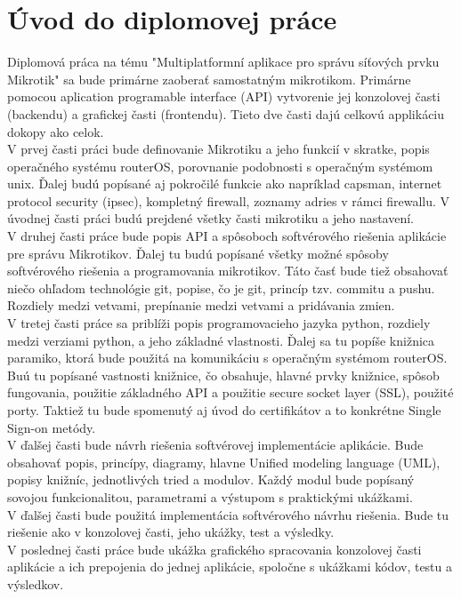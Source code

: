 \chapter{Úvod do diplomovej práce}
Diplomová práca na tému "Multiplatformní aplikace pro správu síťových prvku Mikrotik" sa bude primárne zaoberať samostatným mikrotikom. Primárne pomocou aplication programable interface (API) vytvorenie jej konzolovej časti (backendu) a grafickej časti (frontendu). Tieto dve časti dajú celkovú applikáciu dokopy ako celok.\\
V prvej časti práci bude definovanie Mikrotiku a jeho funkcií v skratke, popis operačného systému routerOS, porovnanie podobnosti s operačným systémom unix. Ďalej budú popísané aj pokročilé funkcie ako napríklad capsman, internet protocol security (ipsec), kompletný firewall, zoznamy adries v rámci firewallu. V úvodnej časti práci budú prejdené všetky časti mikrotiku a jeho nastavení.\\
V druhej časti práce bude popis API a spôsoboch softvérového riešenia aplikácie pre správu Mikrotikov. Ďalej tu budú popísané všetky možné spôsoby softvérového riešenia a programovania mikrotikov. Táto časť bude tiež obsahovať niečo ohľadom technológie git, popise, čo je git, princíp tzv. commitu a pushu. Rozdiely medzi vetvami, prepínanie medzi vetvami a pridávania zmien.\\
V tretej časti práce sa priblíži popis programovacieho jazyka python, rozdiely medzi verziami python, a jeho základné vlastnosti. Ďalej sa tu popíše knižnica paramiko, ktorá bude použitá na komunikáciu s operačným systémom routerOS. Buú tu popísané vastnosti knižnice, čo obsahuje, hlavné prvky knižnice, spôsob fungovania, použitie základného API a použitie secure socket layer (SSL), použité porty. Taktiež tu bude spomenutý aj úvod do certifikátov a to konkrétne Single Sign-on metódy. \\
V ďalšej časti bude návrh riešenia softvérovej implementácie aplikácie. Bude obsahovať popis, princípy, diagramy, hlavne Unified modeling language (UML), popisy knižníc, jednotlivých tried a modulov. Každý modul bude popísaný sovojou funkcionalitou, parametrami a výstupom s praktickými ukážkami.\\
V ďalšej časti bude použitá implementácia softvérového návrhu riešenia. Bude tu riešenie ako v konzolovej časti, jeho ukážky, test a výsledky. \\
V poslednej časti práce bude ukážka grafického spracovania konzolovej časti aplikácie a ich prepojenia do jednej aplikácie, spoločne s ukážkami kódov, testu  a výsledkov.
